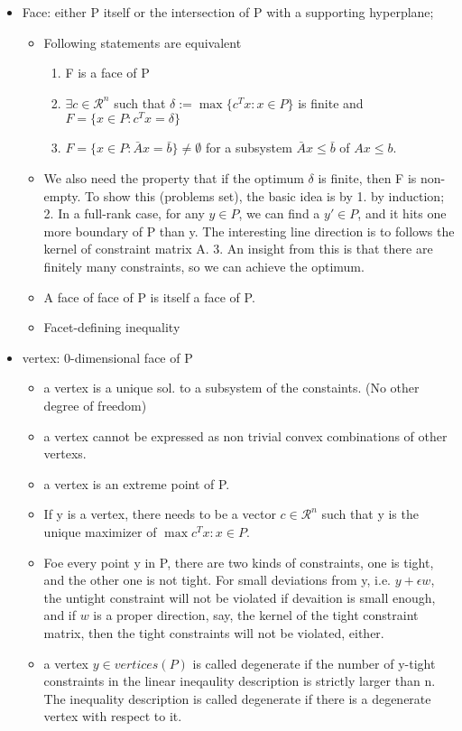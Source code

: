 \documentclass{article}
\begin{document}
\begin{itemize}
\item Face: either P itself or the intersection of P with a supporting hyperplane; 
\begin{itemize}
\item Following statements are equivalent
\begin{enumerate}
\item F is a face of P
\item $\exists c\in \mathcal{R}^n$ such that $\delta :=\max\{c^Tx:x\in P\}$ is finite and $F = \{x\in P: c^Tx = \delta\}$
\item $F=\{x\in P:\bar{A}x=\bar{b}\}\neq \emptyset$ for a subsystem $\bar{A}x\leq\bar{b}$ of $Ax\leq b$.
\end{enumerate}
\item We also need the property that if the optimum $\delta$ is finite, then F is non-empty. To show this (problems set), the basic idea is by 1. by induction; 2. In a full-rank case, for any $y\in P$, we can find a $y'\in P$, and it hits one more boundary of P than y. The interesting line direction is to follows the kernel of constraint matrix A. 3. An insight from this is that there are finitely many constraints, so we can achieve the optimum.
\item A face of face of P is itself a face of P.
\item Facet-defining inequality
\end{itemize}
\item vertex: 0-dimensional face of P
\begin{itemize}
\item a vertex is a unique sol. to a subsystem of the constaints. (No other degree of freedom)
\item a vertex cannot be expressed as non trivial convex combinations of other vertexs.
\item a vertex is an extreme point of P.
\item If y is a vertex, there needs to be a vector $c\in \mathcal{R}^n$ such that y is the unique maximizer of $\max c^Tx: x\in P$.
\item Foe every point y in P, there are two kinds of constraints, one is tight, and the other one is not tight. For small deviations from y, i.e. $y+\epsilon w$, the untight constraint will not be violated if devaition is small enough, and if $w$ is a proper direction, say, the kernel of the tight constraint matrix, then the tight constraints will not be violated, either.
\item a vertex $y\in vertices(P)$ is called degenerate if the number of y-tight constraints in the linear ineqaulity description is strictly larger than n. The inequality description is called degenerate if there is a degenerate vertex with respect to it.

\end{itemize}
\end{itemize}
\end{document}
